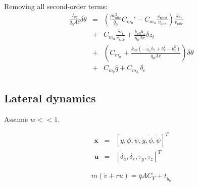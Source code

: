 \documentclass[11pt]{amsart}
\newcommand{\cbar}{\bar{c}}
\newcommand{\qbar}{\bar{q}}
\newcommand{\eff}{\mathrm{eff}}
\newcommand{\wind}{\mathrm{wind}}
\newcommand{\kite}{\mathrm{kite}}
\begin{document}
Removing all second-order terms:
\begin{eqnarray}
\frac{I_{yy}}{\qbar_0 A \cbar} \delta \ddot{\theta} &=&
\left( \frac{\rho v_{\kite}^2}{\qbar_0} C_{m_0}' -
C_{m_{\alpha}} \frac{v_{\wind}}{v_{\kite}} \right) \frac{\delta \dot{x}_t}{v_{\kite}} \\
&+& C_{m_{\alpha}} \frac{\delta \dot{z}_t}{v_{\kite}} +
\frac{k_{\eff} b_x}{\qbar_0 A \cbar} \delta z_t \\
&+& \left(C_{m_{\alpha}} +
\frac{k_{\eff} (-z_t_0 b_z + b_x^2 - b_z^2)}{\qbar_0 A \cbar}\right) \delta \theta \\
&+& C_{m_{\hat{q}}} \hat{q} + C_{m_{\delta_e}} \delta_e
\end{eqnarray}

\subsection{Lateral dynamics}

Assume $w << 1$.

\begin{eqnarray}
\mathbf{x} &=& \left[y, \phi, \psi, \dot{y}, \dot{\phi}, \dot{\psi} \right]^T \\
\mathbf{u} &=& \left[\delta_a, \delta_r, \tau_y, \tau_z \right]^T
\end{eqnarray}

\begin{eqnarray}
m (\dot{v} + r u) = \qbar A C_Y + t_y_b \\

\end{eqnarray}
\end{document}
